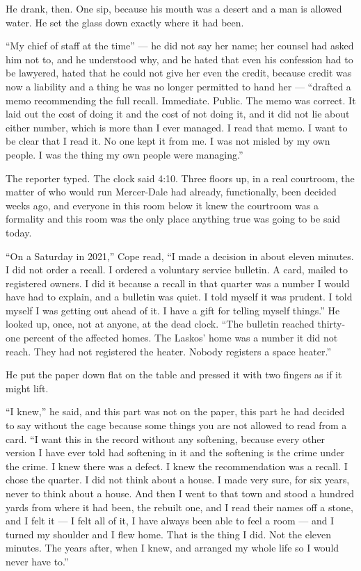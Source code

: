 \documentclass[11pt,openany]{book}
\begin{document}
He drank, then. One sip, because his mouth was a desert and a man is allowed water. He set the glass down exactly where it had been.

``My chief of staff at the time'' --- he did not say her name; her counsel had asked him not to, and he understood why, and he hated that even his confession had to be lawyered, hated that he could not give her even the credit, because credit was now a liability and a thing he was no longer permitted to hand her --- ``drafted a memo recommending the full recall. Immediate. Public. The memo was correct. It laid out the cost of doing it and the cost of not doing it, and it did not lie about either number, which is more than I ever managed. I read that memo. I want to be clear that I read it. No one kept it from me. I was not misled by my own people. I was the thing my own people were managing.''

The reporter typed. The clock said 4:10. Three floors up, in a real courtroom, the matter of who would run Mercer-Dale had already, functionally, been decided weeks ago, and everyone in this room below it knew the courtroom was a formality and this room was the only place anything true was going to be said today.

``On a Saturday in 2021,'' Cope read, ``I made a decision in about eleven minutes. I did not order a recall. I ordered a voluntary service bulletin. A card, mailed to registered owners. I did it because a recall in that quarter was a number I would have had to explain, and a bulletin was quiet. I told myself it was prudent. I told myself I was getting out ahead of it. I have a gift for telling myself things.'' He looked up, once, not at anyone, at the dead clock. ``The bulletin reached thirty-one percent of the affected homes. The Laskos' home was a number it did not reach. They had not registered the heater. Nobody registers a space heater.''

He put the paper down flat on the table and pressed it with two fingers as if it might lift.

``I knew,'' he said, and this part was not on the paper, this part he had decided to say without the cage because some things you are not allowed to read from a card. ``I want this in the record without any softening, because every other version I have ever told had softening in it and the softening is the crime under the crime. I knew there was a defect. I knew the recommendation was a recall. I chose the quarter. I did not think about a house. I made very sure, for six years, never to think about a house. And then I went to that town and stood a hundred yards from where it had been, the rebuilt one, and I read their names off a stone, and I felt it --- I felt all of it, I have always been able to feel a room --- and I turned my shoulder and I flew home. That is the thing I did. Not the eleven minutes. The years after, when I knew, and arranged my whole life so I would never have to.''
\end{document}
